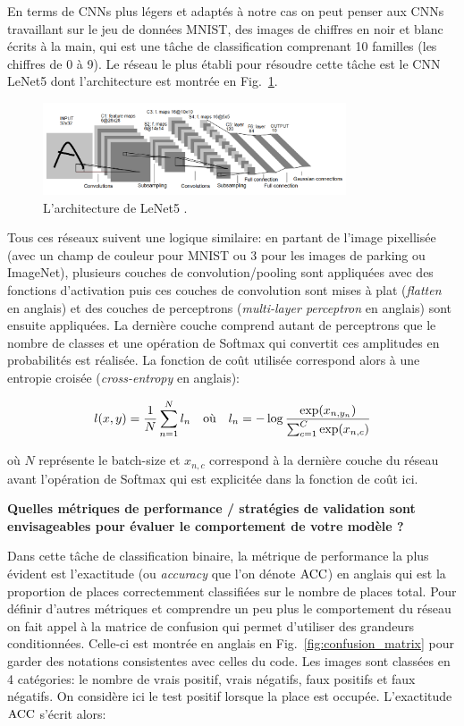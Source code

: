 \documentclass[12pt]{article}
\begin{document}
En terms de CNNs plus légers et adaptés à notre cas on peut penser aux CNNs travaillant sur le jeu de données MNIST, des images de chiffres en noir et blanc écrits à la main, qui est une tâche de classification comprenant 10 familles (les chiffres de 0 à 9). Le réseau le plus établi pour résoudre cette tâche est le CNN LeNet5 \citep{lecun1998} dont l'architecture est montrée en Fig.~\ref{fig:lenet5}.

\begin{figure}[htbp]
    \centering
    \includegraphics[width=0.8\textwidth]{figures/networks/lenet5.png}
    \caption{L'architecture de LeNet5 \citep{lecun1998}.}
    \label{fig:lenet5}
\end{figure}

Tous ces réseaux suivent une logique similaire: en partant de l'image pixellisée (avec un champ de couleur pour MNIST ou 3 pour les images de parking ou ImageNet), plusieurs couches de convolution/pooling sont appliquées avec des fonctions d'activation puis ces couches de convolution sont mises à plat (\textit{flatten} en anglais) et des couches de perceptrons (\textit{multi-layer perceptron} en anglais) sont ensuite appliquées. La dernière couche comprend autant de perceptrons que le nombre de classes et une opération de Softmax qui convertit ces amplitudes en probabilités est réalisée. La fonction de coût utilisée correspond alors à une entropie croisée (\textit{cross-entropy} en anglais):

\begin{equation}
    l(x, y) = \frac{1}{N} \sum_{n=1}^N l_n \qq{où} l_n = - \log \frac{\exp(x_{n, y_n})}{\sum_{c=1}^C \exp(x_{n,c})}
\end{equation}

\noindent où $N$ représente le batch-size et $x_{n, c}$ correspond à la dernière couche du réseau avant l'opération de Softmax qui est explicitée dans la fonction de coût ici.

\textbf{Quelles métriques de performance / stratégies de validation sont envisageables pour évaluer le comportement de votre modèle ?}

Dans cette tâche de classification binaire, la métrique de performance la plus évident est l'exactitude (ou \textit{accuracy} que l'on dénote $\mathrm{ACC}$) en anglais qui est la proportion de places correctemment classifiées sur le nombre de places total. Pour définir d'autres métriques et comprendre un peu plus le comportement du réseau on fait appel à la matrice de confusion qui permet d'utiliser des grandeurs conditionnées. Celle-ci est montrée en anglais en Fig.~\ref{fig:confusion_matrix} pour garder des notations consistentes avec celles du code. Les images sont classées en 4 catégories: le nombre de vrais positif, vrais négatifs, faux positifs et faux négatifs. On considère ici le test positif lorsque la place est occupée. L'exactitude $\mathrm{ACC}$ s'écrit alors:
\end{document}
